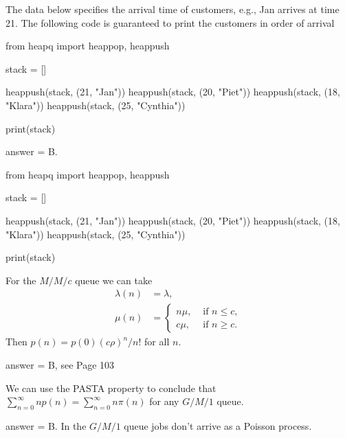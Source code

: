 \begin{exercise}[201903]
  The data below specifies the arrival time of customers, e.g., Jan arrives at time 21.
  The following code is guaranteed to print the customers in order of arrival
\begin{pyverbatim}
from heapq import heappop, heappush


stack = []

heappush(stack, (21, "Jan"))
heappush(stack, (20, "Piet"))
heappush(stack, (18, "Klara"))
heappush(stack, (25, "Cynthia"))

print(stack)
  \end{pyverbatim}
\begin{solution}
answer = B.

\begin{pyconsole}
from heapq import heappop, heappush


stack = []

heappush(stack, (21, "Jan"))
heappush(stack, (20, "Piet"))
heappush(stack, (18, "Klara"))
heappush(stack, (25, "Cynthia"))

print(stack)
\end{pyconsole}


\end{solution}
\end{exercise}

\begin{exercise}[201903]
For the $M/M/c$ queue we can take
  \begin{align*}
\lambda(n) &= \lambda, \\
    \mu(n) &= 
  \begin{cases}
    n\mu, &\text{ if } n \leq c, \\
    c\mu, &\text{ if } n \geq c.
  \end{cases}
  \end{align*}
Then $p(n) = p(0) (c\rho)^n/n!$ for all $n$. 
\begin{solution}
answer = B, see Page 103
\end{solution}
\end{exercise}

\begin{exercise}[201903]
  We can use the PASTA property to conclude that $\sum_{n=0}^\infty n p(n) = \sum_{n=0}^\infty n \pi(n)$ for any $G/M/1$ queue. 
\begin{solution}
answer = B. In the $G/M/1$ queue  jobs don't arrive as a Poisson process. 
\end{solution}
\end{exercise}


